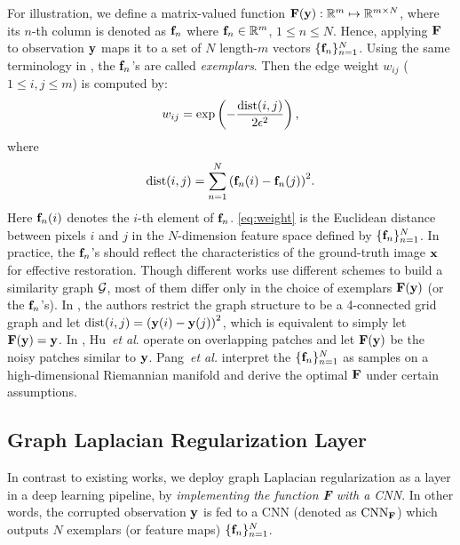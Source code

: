 \documentclass[10pt,twocolumn,letterpaper]{article}
\newcommand{\red}[1]{\textcolor[rgb]{1.0,0.0,0.0}{{#1}}}
\begin{document}
For illustration, we define a matrix-valued function ${\bf F}({\bf y}): \mathbb{R}^m\mapsto\mathbb{R}^{m\times N}$, where its $n$-th column is denoted as ${\bf f}_n$ where ${\bf f}_n\in\mathbb{R}^m$, $1\le n\le N$. 
Hence, applying ${\bf F}$ to observation ${\bf y}$ maps it to a set of $N$ length-$m$ vectors $\{{\bf f}_n\}_{n=1}^{N}$. 
Using the same terminology in \cite{pang2017graph}, the ${{\bf f}_n}$'s are called \emph{exemplars}.
Then the edge weight $w_{ij}$ ($1\le i, j \le m$) is computed by:
%
\begin{equation}\label{eq:weight_ori}
w_{ij} = \exp\left(-\frac{{\rm dist}(i,j)}{2\epsilon^2}\right),
\end{equation}
%
where
%
\begin{equation}\label{eq:weight}
{\rm dist}(i,j) = \sum_{n = 1}^N{\left ( {\bf f}_n(i) - {\bf f}_n(j) \right )^2}.
\end{equation}
%
Here ${\bf f}_n(i)$ denotes the $i$-th element of ${\bf f}_n$. 
\eqref{eq:weight} is the Euclidean distance between pixels $i$ and $j$ in the $N$-dimension feature space defined by $\{{\bf f}_n\}_{n=1}^{N}$. 
In practice, the ${{\bf f}_n}$'s should reflect the characteristics of the ground-truth image ${\bf x}$ for effective restoration. 
Though different works use different schemes to build a similarity graph $\cal G$, most of them differ only in the choice of exemplars ${\bf F}({\bf y})$ (or the ${\bf f}_n$'s). 
In \cite{liu2014progressive,kheradmand2014general}, the authors restrict the graph structure to be a 4-connected grid graph and let ${\rm dist}(i,j)= \left ( {\bf y}(i) - {\bf y}(j) \right )^2$, which is equivalent to simply let ${\bf F}({\bf y})={\bf y}$. 
In \cite{hu2016graph}, Hu~{\it et al}. operate on overlapping patches and let ${\bf F}({\bf y})$ be the noisy patches similar to ${\bf y}$. 
Pang~{\it et al.} \cite{pang2017graph} interpret the $\{{\bf f}_n\}_{n=1}^{N}$ as samples on a high-dimensional Riemannian manifold and derive the optimal ${\bf F}$ under certain assumptions. 

\subsection{Graph Laplacian Regularization Layer}
\label{ssec:glr_layer}
In contrast to existing works, we deploy graph Laplacian regularization as a layer in a deep learning pipeline, by \emph{implementing the function {\bf F} with a CNN}. 
In other words, the corrupted observation ${\bf y}$ is fed to a CNN (denoted as $\rm{CNN}_{\bf F}$) which outputs $N$ exemplars (or feature maps) $\{{\bf f}_n\}_{n=1}^{N}$. 
\end{document}
